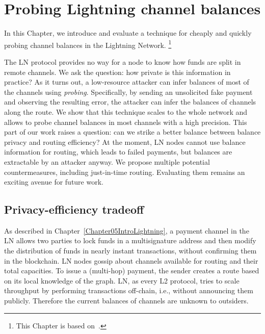 \chapter{Probing Lightning channel balances}

\label{Chapter06LNprobing}

In this Chapter, we introduce and evaluate a technique for cheaply and quickly probing channel balances in the Lightning Network.
\footnote{This Chapter is based on~\cite{Tikhomirov2020}.}


The LN protocol provides no way for a node to know how funds are split in remote channels.
We ask the question: how private is this information in practice?
As it turns out, a low-resource attacker can infer balances of most of the channels using \textit{probing}.
Specifically, by sending an unsolicited fake payment and observing the resulting error, the attacker can infer the balances of channels along the route.
We show that this technique scales to the whole network and allows to probe channel balances in most channels with a high precision.
This part of our work raises a question: can we strike a better balance between balance privacy and routing efficiency?
At the moment, LN nodes cannot use balance information for routing, which leads to failed payments, but balances are extractable by an attacker anyway.
We propose multiple potential countermeasures, including just-in-time routing.
Evaluating them remains an exciting avenue for future work.


\section{Privacy-efficiency tradeoff}

As described in Chapter~\ref{Chapter05IntroLightning}, a payment channel in the LN allows two parties to lock funds in a multisignature address and then modify the distribution of funds in nearly instant transactions, without confirming them in the blockchain.
LN nodes gossip about channels available for routing and their total capacities.
To issue a (multi-hop) payment, the sender creates a route based on its local knowledge of the graph.
LN, as every L2 protocol, tries to scale throughput by performing transactions off-chain, i.e., without announcing them publicly.
Therefore the current balances of channels are unknown to outsiders.

